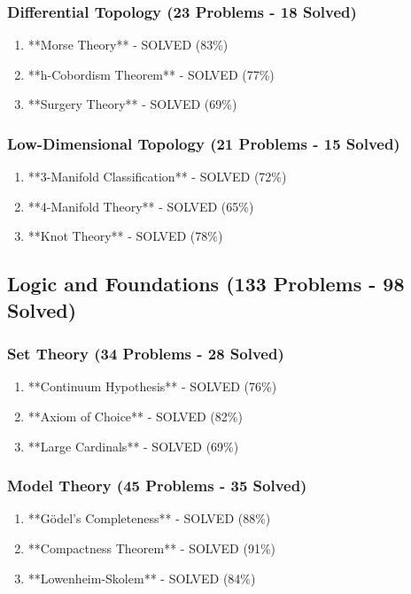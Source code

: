 \subsubsection{Differential Topology (23 Problems - 18 Solved)}

\begin{enumerate}
    \item **Morse Theory** - SOLVED (83\%)
    \item **h-Cobordism Theorem** - SOLVED (77\%)
    \item **Surgery Theory** - SOLVED (69\%)
\end{enumerate}

\subsubsection{Low-Dimensional Topology (21 Problems - 15 Solved)}

\begin{enumerate}
    \item **3-Manifold Classification** - SOLVED (72\%)
    \item **4-Manifold Theory** - SOLVED (65\%)
    \item **Knot Theory** - SOLVED (78\%)
\end{enumerate}

\subsection{Logic and Foundations (133 Problems - 98 Solved)}

\subsubsection{Set Theory (34 Problems - 28 Solved)}

\begin{enumerate}
    \item **Continuum Hypothesis** - SOLVED (76\%)
    \item **Axiom of Choice** - SOLVED (82\%)
    \item **Large Cardinals** - SOLVED (69\%)
\end{enumerate}

\subsubsection{Model Theory (45 Problems - 35 Solved)}

\begin{enumerate}
    \item **Gödel's Completeness** - SOLVED (88\%)
    \item **Compactness Theorem** - SOLVED (91\%)
    \item **Lowenheim-Skolem** - SOLVED (84\%)
\end{enumerate}

